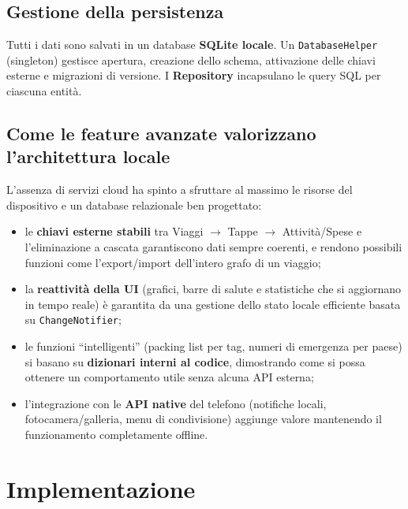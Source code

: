 \documentclass[11pt, a4paper]{article}
\begin{document}
\subsection{Gestione della persistenza}
Tutti i dati sono salvati in un database \textbf{SQLite locale}. Un
\texttt{DatabaseHelper} (singleton) gestisce apertura, creazione dello schema,
attivazione delle chiavi esterne e migrazioni di versione. I \textbf{Repository}
incapsulano le query SQL per ciascuna entità.

\subsection{Come le feature avanzate valorizzano l'architettura locale}
L'assenza di servizi cloud ha spinto a sfruttare al massimo le risorse del
dispositivo e un database relazionale ben progettato:
\begin{itemize}[noitemsep]
    \item le \textbf{chiavi esterne stabili} tra Viaggi $\rightarrow$ Tappe
    $\rightarrow$ Attività/Spese e l'eliminazione a cascata garantiscono dati
    sempre coerenti, e rendono possibili funzioni come l'export/import dell'intero
    grafo di un viaggio;
    \item la \textbf{reattività della UI} (grafici, barre di salute e statistiche
    che si aggiornano in tempo reale) è garantita da una gestione dello stato
    locale efficiente basata su \texttt{ChangeNotifier};
    \item le funzioni ``intelligenti'' (packing list per tag, numeri di emergenza
    per paese) si basano su \textbf{dizionari interni al codice}, dimostrando come
    si possa ottenere un comportamento utile senza alcuna API esterna;
    \item l'integrazione con le \textbf{API native} del telefono (notifiche locali,
    fotocamera/galleria, menu di condivisione) aggiunge valore mantenendo il
    funzionamento completamente offline.
\end{itemize}

\section{Implementazione}
\end{document}
